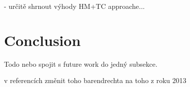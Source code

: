 \documentclass[11pt]{article}
\newcommand{\red}[1]{{\color{red} #1}}
\begin{document}
\begin{article}
{- určitě shrnout výhody HM+TC approache...


}

%
%
%

%
%
%

%
%
%

\section{Conclusion}
Todo nebo spojit s future work do jedný subsekce.


\red{v referencích změnit toho barendrechta na toho z roku 2013}




\end{article}
\end{document}
